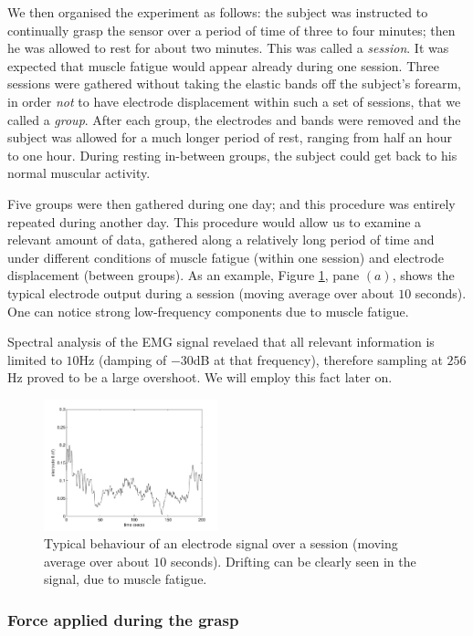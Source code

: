 We then organised the experiment as follows: the subject was
instructed to continually grasp the sensor over a period of time of
three to four minutes; then he was allowed to rest for about two
minutes. This was called a \emph{session}. It was expected that muscle
fatigue would appear already during one session. Three sessions were
gathered without taking the elastic bands off the subject's forearm,
in order \emph{not} to have electrode displacement within such a set
of sessions, that we called a \emph{group}. After each group, the
electrodes and bands were removed and the subject was allowed for a
much longer period of rest, ranging from half an hour to one
hour. During resting in-between groups, the subject could get back to
his normal muscular activity.

Five groups were then gathered during one day; and this procedure was
entirely repeated during another day. This procedure would allow us to
examine a relevant amount of data, gathered along a relatively long
period of time and under different conditions of muscle fatigue
(within one session) and electrode displacement (between groups). As
an example, Figure \ref{fig:drift}, pane $(a)$, shows the typical
electrode output during a session (moving average over about $10$
seconds). One can notice strong low-frequency components due to muscle
fatigue.

Spectral analysis of the EMG signal revelaed that all relevant
information is limited to $10$Hz (damping of $-30$dB at that
frequency), therefore sampling at $256$Hz proved to be a large
overshoot. We will employ this fact later on.

\begin{figure}[!ht] \centering
  \includegraphics[width=0.45\textwidth]{figs/el8_movingAvg_s1}
  \caption{Typical behaviour of an electrode signal over a
    session (moving average over about $10$ seconds). Drifting can be
    clearly seen in the signal, due to muscle fatigue.}
  \label{fig:drift}
\end{figure}

\subsubsection{Force applied during the grasp}

